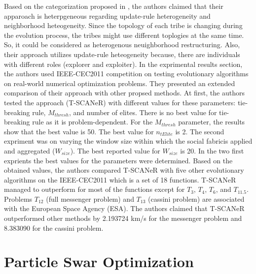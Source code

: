 Based on the categorization proposed in \citet{de2009heterogeneous}, the authors claimed that their apparoach is heterpgeneous regarding update-rule heterogeneity and neighborhood heteogeneity. Since the topology of each tribe is changing during the evolution process, the tribes might use different toplogies at the same time. So, it could be considered as heterogenous neuighborhood restructuring. Also, their approach utilizes update-rule heteogeneity because, there are individuals with different roles (explorer and exploiter). \newline
In the exprimental results section, the authors used IEEE-CEC2011 competition on testing evolutionary algorithms on real-world numerical optimization problems. They presented an extended comparison of their approach with other propsed methods. At first, the authors tested the approach (T-SCANeR) with different values for these parameters: tie-breaking rule, $M_{thresh}$, and number of elites. There is no best value for tie-breaking rule as it is problem-dependent. For the $M_{thresh}$ parameter, the results show that the best value is 50. The best value for $n_{tElite}$ is 2. The second expriment was on varying the  window  size  within  which  the  social  fabricis  applied  and  aggregated ($W_{size}$). The best reported value for $W_{size}$ is 20. \newline
In the two first exprients the best values for the parameters were determined. Based on the obtained values, the authors compared T-SCANeR with five other evolutionary algorithms on the IEEE-CEC2011 which is a set of 18 functions. T-SCANeR managed to outperform for most of the functions except for $T_{3}$, $T_{4}$, $T_{6}$, and $T_{11.5}$. Problems $T_{12}$ (full messenger problem) and $T_{13}$ (cassini problem) are associated with the European Space Agency (ESA). The authors claimed that T-SCANeR outperformed other methods by 2.193724 km/s for the messenger problem and 8.383090 for the cassini problem.
\section{Particle Swar Optimization}
